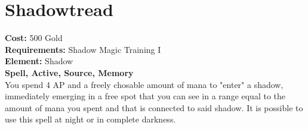 \section{Shadowtread}
\textbf{Cost:} 500 Gold\\
\textbf{Requirements:} Shadow Magic Training I\\
\textbf{Element:} Shadow\\
\textbf{Spell, Active, Source, Memory}\\
You spend 4 AP and a freely chosable amount of mana to "enter" a shadow, immediately emerging in a free spot that you can see in a range equal to the amount of mana you spent and that is connected to said shadow. It is possible to use this spell at night or in complete darkness.\\